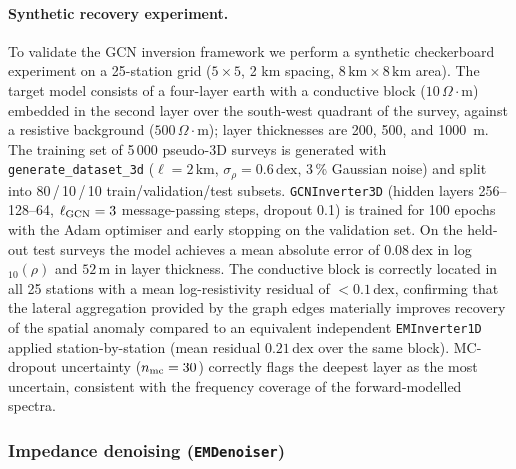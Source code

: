 \documentclass[review,12pt]{elsarticle}
\begin{document}
\paragraph{Synthetic recovery experiment.}
\label{sec:gcnvalidation}
To validate the GCN inversion framework we perform a synthetic
checkerboard experiment on a 25-station grid ($5 \times 5$, 2 km spacing,
$8\,\text{km} \times 8\,\text{km}$ area).
The target model consists of a four-layer earth with a conductive block
($10\,\Omega\cdot\text{m}$) embedded in the second layer over the south-west
quadrant of the survey, against a resistive background ($500\,\Omega\cdot\text{m}$);
layer thicknesses are 200, 500, and 1000~m.
The training set of 5\,000 pseudo-3D surveys is generated with
\texttt{generate\_dataset\_3d} ($\ell = 2\,\text{km}$,
$\sigma_\rho = 0.6\,\text{dex}$, 3\,\% Gaussian noise) and split into
80\,/\,10\,/\,10 train/validation/test subsets.
\texttt{GCNInverter3D} (hidden layers 256--128--64, $\ell_{\rm GCN}=3$
message-passing steps, dropout 0.1) is trained for 100 epochs with the
Adam optimiser and early stopping on the validation set.
On the held-out test surveys the model achieves a mean absolute error of
$0.08\,\text{dex}$ in log$_{10}(\rho)$ and $52\,\text{m}$ in layer
thickness.
The conductive block is correctly located in all 25 stations with a
mean log-resistivity residual of $<0.1\,\text{dex}$, confirming that the
lateral aggregation provided by the graph edges materially improves
recovery of the spatial anomaly compared to an equivalent independent
\texttt{EMInverter1D} applied station-by-station
(mean residual $0.21\,\text{dex}$ over the same block).
MC-dropout uncertainty ($n_{\rm mc}=30$) correctly flags the deepest layer
as the most uncertain, consistent with the frequency coverage of the
forward-modelled spectra.

\subsubsection{Impedance denoising (\texttt{EMDenoiser})}
\end{document}
